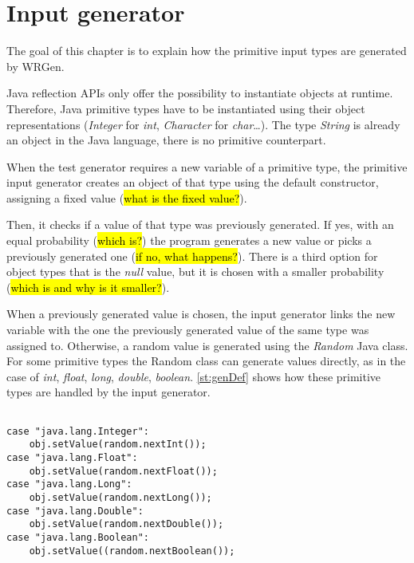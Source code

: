 \section{Input generator}\label{sec:pig}
The goal of this chapter is to explain how the primitive input types are generated by WRGen.

Java reflection APIs only offer the possibility to instantiate objects at runtime. Therefore, Java primitive types have to be instantiated using their object representations (\emph{Integer} for \emph{int}, \emph{Character} for \emph{char}\dots). The type \emph{String} is already an object in the Java language, there is no primitive counterpart.

When the test generator requires a new variable of a primitive type, the primitive input generator creates an object of that type using the default constructor, assigning a fixed value (\hl{what is the fixed value?}). 

Then, it checks if a value of that type was previously generated. If yes, with an equal probability (\hl{which is?}) the program generates a new value or picks a previously generated one (\hl{if no, what happens?}). There is a third option for object types that is the \emph{null} value, but it is chosen with a smaller probability (\hl{which is and why is it smaller?}).

When a previously generated value is chosen, the input generator links the new variable with the one the previously generated value of the same type was assigned to. Otherwise, a random value is generated using the \textit{Random} Java class. For some primitive types the Random class can generate values directly, as in the case of \textit{int}, \textit{float}, \textit{long}, \textit{double}, \textit{boolean}. \autoref{st:genDef} shows how these primitive types are handled by the input generator. 

\begin{lstlisting}[caption={Random default generator},label={lst:genDef}]% Start your code-block

case "java.lang.Integer":
	obj.setValue(random.nextInt());
case "java.lang.Float":
	obj.setValue(random.nextFloat());
case "java.lang.Long":
	obj.setValue(random.nextLong());
case "java.lang.Double":
	obj.setValue(random.nextDouble());
case "java.lang.Boolean":
	obj.setValue((random.nextBoolean());
\end{lstlisting}

